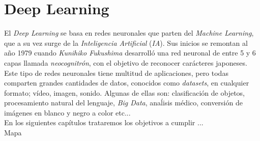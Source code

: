 \section{Deep Learning}
\label{sec:deeplearning}
El \textit{Deep Learning} se basa en redes neuronales que parten del \textit{Machine Learning}, que a su vez surge de la \textit{Inteligencia Artificial} (\textit{IA}). Sus inicios se remontan al año 1979 cuando \textit{Kunihiko Fukushima} desarrolló una red neuronal de entre 5 y 6 capas llamada \textit{neocognitrón}\cite{neocognitron}, con el objetivo de reconocer carácteres japoneses.\\

Este tipo de redes neuronales tiene multitud de aplicaciones, pero todas comparten grandes cantidades de datos, conocidos como \textit{datasets}, en cualquier formato; vídeo, imagen, sonido. Algunas de ellas son: clasificación de objetos, procesamiento natural del lenguaje, \textit{Big Data}, anaĺisis médico, conversión de imágenes en blanco y negro a color etc...\\

En los siguientes capítulos trataremos los objetivos a cumplir ...\\

Mapa